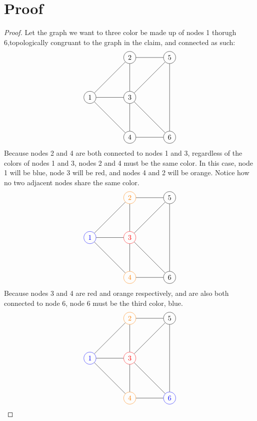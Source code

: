 \documentclass[10 pt]{amsart}
\theoremstyle{definition}
\theoremstyle{remark}
\numberwithin{equation}{subsection}
\begin{document}
\section*{Proof}
\begin{proof}
Let the graph we want to three color be made up of nodes 1 thorugh 6,\newline topologically congruant to the graph in the claim, and connected as such:
\[
\begin{tikzpicture}
\node[circle, draw] (1) at (0,2){1};
\node[circle, draw] (2) at (2,4){2};
\node[circle, draw] (3) at (2,2){3};
\node[circle, draw] (4) at (2,0){4};
\node[circle, draw] (5) at (4,4){5};
\node[circle, draw] (6) at (4,0){6};
\foreach \from/\to in 
{1/2,1/3,1/4,2/3,2/5,5/3,5/6,3/4,3/6,4/6}
\draw (\from) -- (\to);
\end{tikzpicture}
\]
Because nodes 2 and 4 are both connected to nodes 1 and 3, regardless of the colors of nodes 1 and 3, nodes 2 and 4 must be the same color.
\newline
\newline
In this case, node 1 will be blue, node 3 will be red, and nodes 4 and 2 will be orange. Notice how no two adjacent nodes share the same color.
\[
\begin{tikzpicture}
\node[circle, draw, color=blue] (1) at (0,2){1};
\node[circle, draw, color=orange] (2) at (2,4){2};
\node[circle, draw, color=red] (3) at (2,2){3};
\node[circle, draw, color=orange] (4) at (2,0){4};
\node[circle, draw] (5) at (4,4){5};
\node[circle, draw] (6) at (4,0){6};
\foreach \from/\to in 
{1/2,1/3,1/4,2/3,2/5,5/3,5/6,3/4,3/6,4/6}
\draw (\from) -- (\to);
\end{tikzpicture}
\]
Because nodes 3 and 4 are red and orange respectively, and are also both connected to node 6, node 6 must be the third color, blue.
\[
\begin{tikzpicture}
\node[circle, draw, color=blue] (1) at (0,2){1};
\node[circle, draw, color=orange] (2) at (2,4){2};
\node[circle, draw, color=red] (3) at (2,2){3};
\node[circle, draw, color=orange] (4) at (2,0){4};
\node[circle, draw] (5) at (4,4){5};
\node[circle, draw, color=blue] (6) at (4,0){6};
\foreach \from/\to in 
{1/2,1/3,1/4,2/3,2/5,5/3,5/6,3/4,3/6,4/6}
\draw (\from) -- (\to);
\end{tikzpicture}
\]
\end{proof}
\end{document}
